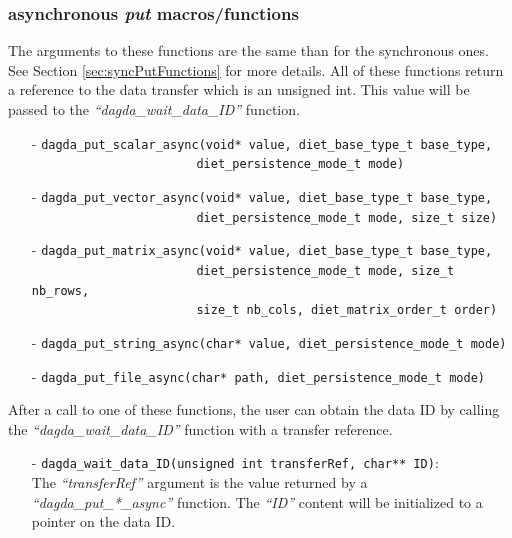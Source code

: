\subsubsection{\dagda asynchronous \textit{put} macros/functions}
The arguments to these functions are the same than for the synchronous
ones.  See Section \ref{sec:syncPutFunctions} for more details. All of
these functions return a reference to the data transfer which is an
unsigned int. This value will be passed to the
\textit{``dagda\_wait\_data\_ID''} function.
\begin{itemize}
\item[-] \verb#dagda_put_scalar_async(void* value, diet_base_type_t base_type,#\\
         \verb#                       diet_persistence_mode_t mode)#
\item[-] \verb#dagda_put_vector_async(void* value, diet_base_type_t base_type,#\\
         \verb#                       diet_persistence_mode_t mode, size_t size)#
\item[-] \verb#dagda_put_matrix_async(void* value, diet_base_type_t base_type,#\\
         \verb#                       diet_persistence_mode_t mode, size_t nb_rows,#\\
         \verb#                       size_t nb_cols, diet_matrix_order_t order)#
\item[-] \verb#dagda_put_string_async(char* value, diet_persistence_mode_t mode)#
\item[-] \verb#dagda_put_file_async(char* path, diet_persistence_mode_t mode)#
\end{itemize}
After a call to one of these functions, the user can obtain the data ID by
calling the \textit{``dagda\_wait\_data\_ID''} function with a transfer
reference.
\begin{itemize}
  \item[-] \verb#dagda_wait_data_ID(unsigned int transferRef, char** ID)#:\\
    The \textit{``transferRef''} argument is the value returned by a
    \textit{``dagda\_put\_*\_async''} function. The \textit{``ID''} content will
    be initialized to a pointer on the data ID.
\end{itemize}

